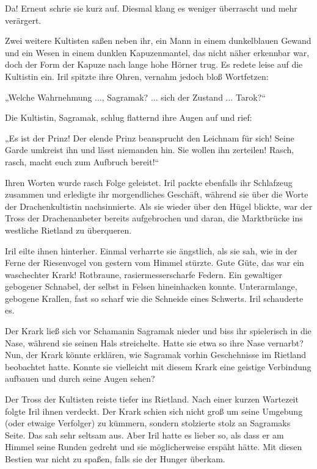 Da! Erneut schrie sie kurz auf. Diesmal klang es weniger überrascht und mehr verärgert.

Zwei weitere Kultisten saßen neben ihr, ein Mann in einem dunkelblauen Gewand und ein Wesen in einem dunklen Kapuzenmantel, das nicht näher erkennbar war, doch der Form der Kapuze nach lange hohe Hörner trug. Es redete leise auf die Kultistin ein. Iril spitzte ihre Ohren, vernahm jedoch bloß Wortfetzen:

„Welche Wahrnehmung ..., Sagramak? ... sich der Zustand ... Tarok?“

Die Kultistin, Sagramak, schlug flatternd ihre Augen auf und rief:

„Es ist der Prinz! Der elende Prinz beansprucht den Leichnam für sich! Seine Garde umkreist ihn und lässt niemanden hin. Sie wollen ihn zerteilen! Rasch, rasch, macht euch zum Aufbruch bereit!“

Ihren Worten wurde rasch Folge geleistet. Iril packte ebenfalls ihr Schlafzeug zusammen und erledigte ihr morgendliches Geschäft, während sie über die Worte der Drachenkultistin nachsinnierte. Als sie wieder über den Hügel blickte, war der Tross der Drachenanbeter bereits aufgebrochen und daran, die Marktbrücke ins westliche Rietland zu überqueren.

Iril eilte ihnen hinterher. Einmal verharrte sie ängstlich, als sie sah, wie in der Ferne der Riesenvogel von gestern vom Himmel stürzte. Gute Güte, das war ein waschechter Krark! Rotbraune, rasiermesserscharfe Federn. Ein gewaltiger gebogener Schnabel, der selbst in Felsen hineinhacken konnte. Unterarmlange, gebogene Krallen, fast so scharf wie die Schneide eines Schwerts. Iril schauderte es.

Der Krark ließ sich vor Schamanin Sagramak nieder und biss ihr spielerisch in die Nase, während sie seinen Hals streichelte. Hatte sie etwa so ihre Nase vernarbt? Nun, der Krark könnte erklären, wie Sagramak vorhin Geschehnisse im Rietland beobachtet hatte. Konnte sie vielleicht mit diesem Krark eine geistige Verbindung aufbauen und durch seine Augen sehen?

Der Tross der Kultisten reiste tiefer ins Rietland. Nach einer kurzen Wartezeit folgte Iril ihnen verdeckt. Der Krark schien sich nicht groß um seine Umgebung (oder etwaige Verfolger) zu kümmern, sondern stolzierte stolz an Sagramaks Seite. Das sah sehr seltsam aus. Aber Iril hatte es lieber so, als dass er am Himmel seine Runden gedreht und sie möglicherweise erspäht hätte. Mit diesen Bestien war nicht zu spaßen, falls sie der Hunger überkam.

